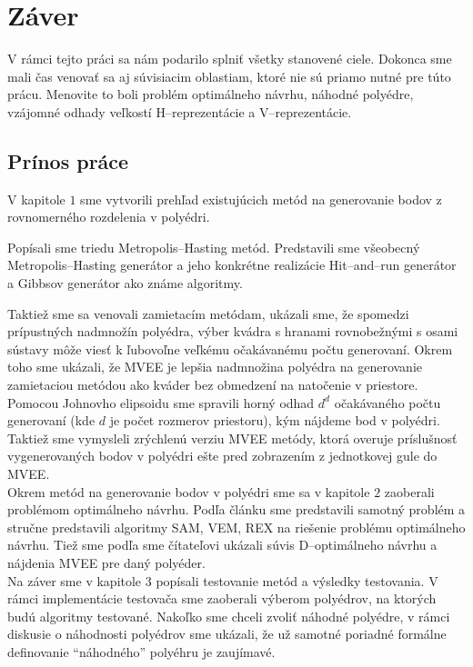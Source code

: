\chapter*{Záver}  %

V rámci tejto práci sa nám podarilo splniť všetky stanovené ciele. Dokonca sme mali čas venovať sa aj súvisiacim oblastiam, ktoré nie sú priamo nutné pre túto prácu. Menovite to boli problém optimálneho návrhu, náhodné polyédre, vzájomné odhady veľkostí H--reprezentácie a V--reprezentácie.

\section{Prínos práce}
V kapitole $1$ sme vytvorili prehľad existujúcich metód na generovanie bodov z rovnomerného rozdelenia v polyédri.

Popísali sme triedu Metropolis--Hasting metód. Predstavili sme všeobecný Metropolis--Hasting generátor a jeho konkrétne realizácie Hit--and--run generátor a Gibbsov generátor ako známe algoritmy.

Taktiež sme sa venovali zamietacím metódam, ukázali sme, že spomedzi prípustných nadmnožín polyédra, výber kvádra s hranami rovnobežnými s osami sústavy môže viesť k ľubovoľne veľkému očakávanému počtu generovaní. Okrem toho sme ukázali, že MVEE je lepšia nadmnožina polyédra na generovanie zamietaciou metódou ako kváder bez obmedzení na natočenie v priestore. Pomocou Johnovho elipsoidu sme spravili horný odhad $d^d$ očakávaného počtu generovaní (kde $d$ je počet rozmerov priestoru), kým nájdeme bod v polyédri. Taktiež sme vymysleli zrýchlenú verziu MVEE metódy, ktorá overuje príslušnosť vygenerovaných bodov v polyédri ešte pred zobrazením z jednotkovej gule do MVEE.\\

Okrem metód na generovanie bodov v polyédri sme sa v kapitole $2$ zaoberali problémom optimálneho návrhu. Podľa článku \cite{rex_harman} sme predstavili samotný problém a stručne predstavili algoritmy SAM, VEM, REX na riešenie problému optimálneho návrhu. Tiež sme podľa \cite{rex_harman} sme čítateľovi ukázali súvis D--optimálneho návrhu a nájdenia MVEE pre daný polyéder.\\

Na záver sme v kapitole $3$ popísali testovanie metód a výsledky testovania. V rámci implementácie testovača sme zaoberali výberom polyédrov, na ktorých budú algoritmy testované. Nakoľko sme chceli zvoliť náhodné polyédre, v rámci diskusie o náhodnosti polyédrov sme ukázali, že už samotné poriadné formálne definovanie ``náhodného'' polyéhru je zaujímavé.

